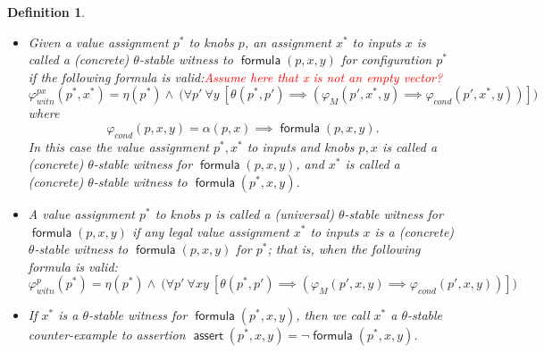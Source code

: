 \documentclass[a4paper,parskip=half]{article} %
\newcommand*\eqdef=
\newcommand*\query{\operatorname{\mathsf{query}}}
\newcommand*\assert{\operatorname{\mathsf{assert}}}
\newcommand*\formula{\operatorname{\mathsf{formula}}}
\newcommand\todozk[1]{\textcolor{red}{#1}}
\newtheorem{defn}[thm]{Definition}
\newcommand*\ZK{\todozk}
\newcommand{\delete}[1]{}
\begin{document}
\begin{defn}\label{def:stable:witness:validity}
\begin{itemize}
\item 
Given a value assignment $p^*$ to knobs $p$, an assignment $x^*$ to inputs $x$ is called a \emph{(concrete) $\theta$-stable witness} 
to $\formula(p,x,y)$ for configuration $p^*$ if the following formula is valid:\ZK{Assume here that x is not an empty vector?}
\begin{equation}\label{form:gear:certify:knobs:inputs}
\varphi_{\mathit{witn}}^{px}(p^*,x^*) \eqdef
     \eta(p^*) \wedge ~\big(
    \forall p'~
    \forall y~[
   \theta(p^*, p') \implies (\varphi_M(p',x^*,y)  \implies  \varphi_{\mathit{cond}}(p',x^*,y))
    ]\big)
\end{equation}
where \[\varphi_{\mathit{cond}}(p,x,y) \eqdef \alpha(p,x) \implies \formula(p,x,y).\]
In this case the value assignment $p^*, x^*$ to inputs and knobs $p,x$ is called a  \emph{(concrete) $\theta$-stable witness for $\formula(p,x,y)$}, 
and $x^*$ is called a  \emph{(concrete) $\theta$-stable witness to $\formula(p^*,x,y)$}.
\item 
A value assignment $p^*$ to knobs $p$ is called a  \emph{(universal) $\theta$-stable witness for $\formula(p,x,y)$} if any legal value assignment 
$x^*$ to inputs $x$ is a (concrete) $\theta$-stable witness to $\formula(p,x,y)$ for $p^*$; that is, when the following formula is valid:
\begin{equation}\label{form:gear:certify:knobs}
\varphi_{\mathit{witn}}^{p}(p^*) \eqdef
     \eta(p^*) \wedge ~\big(
    \forall p'~
    \forall xy~[
   \theta(p^*, p') \implies (\varphi_M(p',x,y)  \implies  \varphi_{\mathit{cond}}(p',x,y))
    ]\big)
\end{equation}
\item 
If $x^*$ is a  $\theta$-stable witness for $\formula(p^*, x,y)$, then we call $x^*$  a \emph{$\theta$-stable counter-example to  
assertion $\assert(p^*, x,y)  \eqdef \neg \formula(p^*, x,y)$}.
\delete{
An assertion $\assert(p, x,y)$ is called \emph{$\theta$-valid with respect to knob configuration $p^*$} if its negation 
$\query(p, x,y) \eqdef \neg \assert(p, x,y)$ does not have a $\theta$-stable witness $x^*$ for $p^*$.  In the latter case  
assertion $\assert(p^*, x,y)$ is called \emph{$\theta$-valid}. Otherwise, if $x^*$ is a  $\theta$-stable witness for 
$\query(p^*, x,y)$, then we call $x^*$  a \emph{$\theta$-stable counter-example to  $\assert(p^*, x,y)$}, and 
$\assert(p^*, x,y)$ is \emph{$\theta$-falsifiable} (that is, it is not $\theta$-valid).
}
\end{itemize}
\end{defn}
\end{document}
